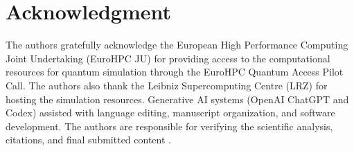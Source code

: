 \documentclass{ieeeaccess}
\begin{document}
\section*{Acknowledgment}
The authors gratefully acknowledge the European High Performance Computing Joint Undertaking (EuroHPC JU) for providing access to the computational resources for quantum simulation through the EuroHPC Quantum Access Pilot Call. The authors also thank the Leibniz Supercomputing Centre (LRZ) for hosting the simulation resources. Generative AI systems (OpenAI ChatGPT and Codex) assisted with language editing, manuscript organization, and software development. The authors are responsible for verifying the scientific analysis, citations, and final submitted content \cite{openai2026}.
\end{document}

